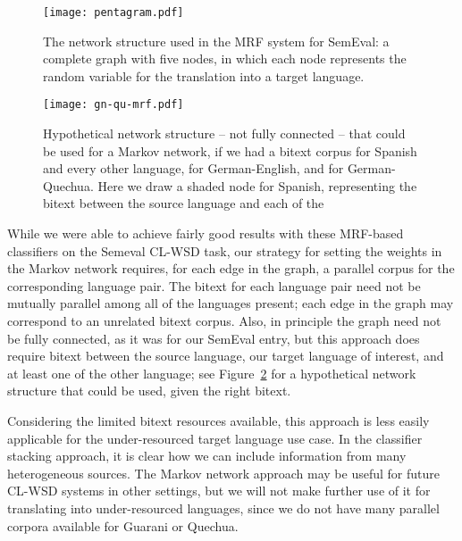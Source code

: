 \begin{figure}
  \begin{center}
  \texttt{[image: pentagram.pdf]}
  \end{center}
  \caption{The network structure used in the MRF system for SemEval: a complete
  graph with five nodes, in which each node represents the random variable for
  the translation into a target language.}
  \label{fig:pentagram}
\end{figure}

\begin{figure}
  \begin{center}
  \texttt{[image: gn-qu-mrf.pdf]}
  \end{center}
  \caption{Hypothetical network structure -- not fully connected -- that could
  be used for a Markov network, if we had a bitext corpus for Spanish and every
  other language, for German-English, and for German-Quechua. Here we draw a
  shaded node for Spanish, representing the bitext between the source language
  and each of the }
  \label{fig:gn-qu-mrf}
\end{figure}

While we were able to achieve fairly good results with these MRF-based
classifiers on the Semeval CL-WSD task, our strategy for setting the weights in
the Markov network requires, for each edge in the graph, a parallel corpus for
the corresponding language pair. The bitext for each language pair need not be
mutually parallel among all of the languages present; each edge in the graph
may correspond to an unrelated bitext corpus.  Also, in principle the graph
need not be fully connected, as it was for our SemEval entry, but this approach
does require bitext between the source language, our target language of
interest, and at least one of the other language; see
Figure~\ref{fig:gn-qu-mrf} for a hypothetical network structure that could be
used, given the right bitext.

Considering the limited bitext resources available, this approach is less
easily applicable for the under-resourced target language use case.  In the
classifier stacking approach, it is clear how we can include information from
many heterogeneous sources. The Markov network approach may be useful for
future CL-WSD systems in other settings, but we will not make further use of it
for translating into under-resourced languages, since we do not have many
parallel corpora available for Guarani or Quechua.

